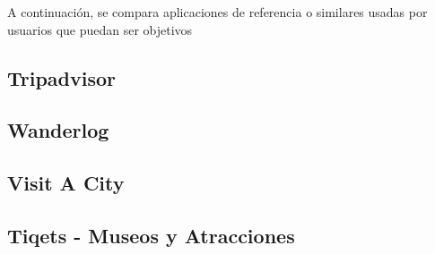 
A continuación, se compara aplicaciones de referencia o similares usadas por usuarios que puedan ser objetivos
\subsection{Tripadvisor}
\subsection{Wanderlog}
\subsection{Visit A City}
\subsection{Tiqets - Museos y Atracciones}